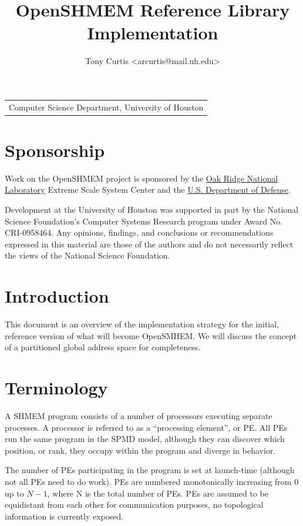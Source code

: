 \documentclass[english]{article}
\newcommand{\lyxrightaddress}[1]{
\par {\raggedleft \begin{tabular}{l}\ignorespaces
#1
\end{tabular}
\vspace{1.4em}
\par}
}
\begin{document}
\title{OpenSHMEM Reference Library Implementation}
\author{Tony Curtis <arcurtis@mail.uh.edu>}
\maketitle
\lyxrightaddress{Computer Science Department, University of Houston}

\pagebreak{}
\tableofcontents{}
\pagebreak{}

\section{Sponsorship}

Work on the OpenSHMEM project is sponsored by the
\href{http://www.ornl.gov/}{Oak Ridge National Laboratory} Extreme
Scale System Center and the \href{http://www.defense.gov/}{U.S. Department
of Defense}.

Development at the University of Houston was supported in part by the
National Science Foundation's Computer Systems Research program under
Award No. CRI-0958464.  Any opinions, findings, and conclusions or
recommendations expressed in this material are those of the authors
and do not necessarily reflect the views of the National Science
Foundation.

\section{Introduction}

This document is an overview of the implementation strategy for the
initial, reference version of what will become OpenSMHEM. We will
discuss the concept of a partitioned global address space for
completeness.

\section{Terminology}

A SHMEM program consists of a number of processors executing separate
processes. A processor is referred to as a ``processing element'',
or PE. All PEs run the same program in the SPMD model, although they
can discover which position, or rank, they occupy within the program
and diverge in behavior.

The number of PEs participating in the program is set at launch-time
(although not all PEs need to do work). PEs are numbered monotonically
increasing from 0 up to $N-1$, where N is the total number of PEs.
PEs are assumed to be equidistant from each other for communication
purposes, no topological information is currently exposed.
\end{document}
